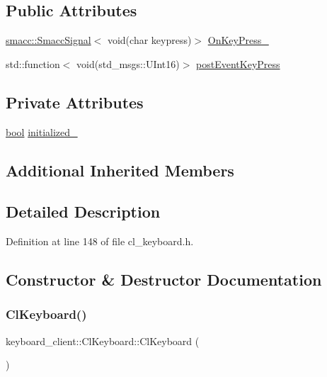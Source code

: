 \subsection*{Public Attributes}
\begin{DoxyCompactItemize}
\item 
\hyperlink{classsmacc_1_1SmaccSignal}{smacc\+::\+Smacc\+Signal}$<$ void(char keypress)$>$ \hyperlink{classkeyboard__client_1_1ClKeyboard_a0fcb5b4432b26b8c8ca6924e8e82fbeb}{On\+Key\+Press\+\_\+}
\item 
std\+::function$<$ void(std\+\_\+msgs\+::\+U\+Int16)$>$ \hyperlink{classkeyboard__client_1_1ClKeyboard_aadd675eea47a012b348a4e6c00e7e9d0}{post\+Event\+Key\+Press}
\end{DoxyCompactItemize}
\subsection*{Private Attributes}
\begin{DoxyCompactItemize}
\item 
\hyperlink{classbool}{bool} \hyperlink{classkeyboard__client_1_1ClKeyboard_aff74d4f212f4846a1f7cc6c0e4d5f728}{initialized\+\_\+}
\end{DoxyCompactItemize}
\subsection*{Additional Inherited Members}


\subsection{Detailed Description}


Definition at line 148 of file cl\+\_\+keyboard.\+h.



\subsection{Constructor \& Destructor Documentation}
\mbox{\label{classkeyboard__client_1_1ClKeyboard_a4da263c77c076b959c4c21160af1bcb5}} 
\subsubsection{\texorpdfstring{Cl\+Keyboard()}{ClKeyboard()}}
{\footnotesize\ttfamily keyboard\+\_\+client\+::\+Cl\+Keyboard\+::\+Cl\+Keyboard (\begin{DoxyParamCaption}{ }\end{DoxyParamCaption})}




